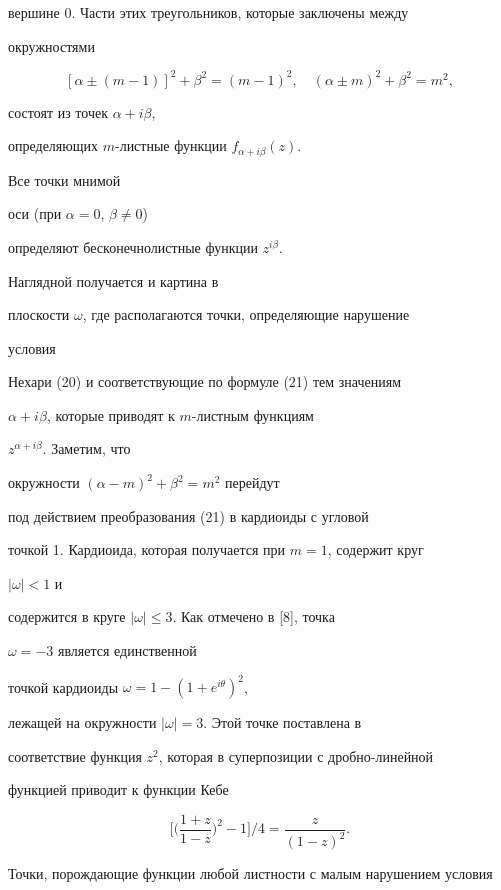 вершине $0$. Части этих треугольников, которые заключены между 


окружностями 


$$ 


[\alpha\pm(m-1)]^2+\beta^2=(m-1)^2,\quad 


(\alpha\pm m)^2+\beta^2=m^2, 


$$ 


состоят из точек $\alpha+i\beta$, 


определяющих $m$-листные функции $f_{\alpha+i\beta}(z)$. 


Все точки мнимой 


оси (при $\alpha=0$, $\beta \ne 0$) 


определяют бесконечнолистные функции $z^{i\beta}$. 


 


Наглядной получается и картина в 


плоскости $\omega$, где располагаются точки, определяющие нарушение 


условия 


Нехари (20) и соответствующие по формуле (21) тем значениям 


$\alpha+i\beta$, которые приводят к $m$-листным функциям 


$z^{\alpha+i\beta}$. Заметим, что 


окружности $(\alpha-m)^2+\beta^2=m^2$ перейдут 


под действием преобразования (21) в кардиоиды с угловой


точкой 1. Кардиоида, которая получается при $m=1$, содержит круг 


$|\omega|<1$ и 


содержится в круге $|\omega|\le 3$. Как отмечено в [8], точка 


$\omega=-3$ является единственной 


точкой кардиоиды $\omega=1-(1+e^{i\theta})^2$, 


лежащей на окружности $|\omega|=3$. Этой точке поставлена в 


соответствие функция $z^2$, которая в суперпозиции с дробно-линейной 


функцией приводит к функции Кебе 


$$ 


\bigg[\bigg(\frac{1+z}{1-z}\bigg)^2-1\bigg]\Big/4= 


\frac{z}{(1-z)^2}. 


$$ 


Точки, порождающие функции любой листности с малым нарушением условия 


